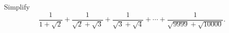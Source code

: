 Simplify
\[
\dfrac{1}{1+\sqrt2}+\dfrac{1}{\sqrt2+\sqrt3}+\dfrac{1}{\sqrt3+\sqrt4}+\cdots+\dfrac{1}{\sqrt{9999}+\sqrt{10000}} .
\]

